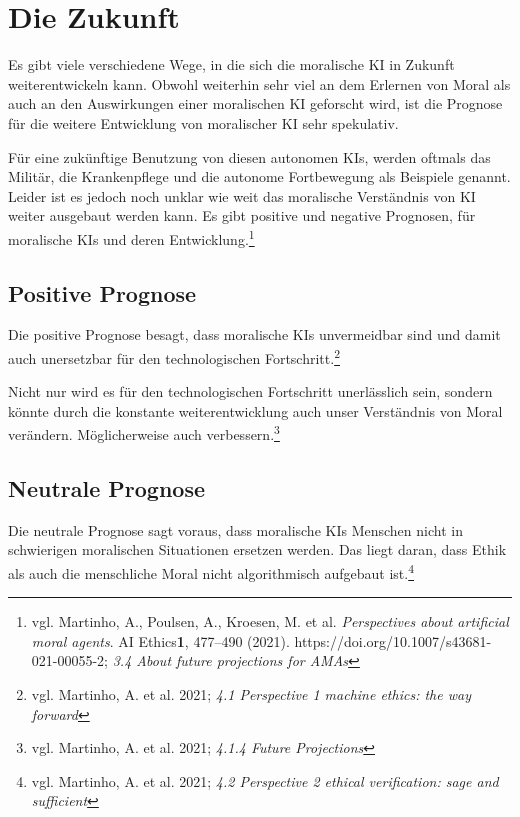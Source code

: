 \section{Die Zukunft}\label{sec::zukunft}

Es gibt viele verschiedene Wege, in die sich die moralische KI in Zukunft weiterentwickeln kann.
Obwohl weiterhin sehr viel an dem Erlernen von Moral als auch an den Auswirkungen einer
moralischen KI geforscht wird, ist die Prognose für die weitere Entwicklung von moralischer KI sehr spekulativ.

Für eine zukünftige Benutzung von diesen autonomen KIs, werden oftmals das Militär, die Krankenpflege
und die autonome Fortbewegung als Beispiele genannt. 
Leider ist es jedoch noch unklar wie weit das moralische Verständnis von KI weiter ausgebaut werden kann.
Es gibt positive und negative Prognosen, für moralische KIs und deren Entwicklung.\footnote{vgl. Martinho, A., Poulsen, A., Kroesen, M. et al. \textit{Perspectives about artificial moral agents}.
AI Ethics\textbf{1}, 477–490 (2021).
https://doi.org/10.1007/s43681-021-00055-2; \textit{3.4 About future projections for AMAs}}

\subsection{Positive Prognose}\label{subsec::positive prognose}

Die positive Prognose besagt, dass moralische KIs unvermeidbar sind und damit auch
unersetzbar für den technologischen Fortschritt.\footnote{vgl. Martinho, A. et al. 2021; \textit{4.1 Perspective 1 machine ethics: the way forward}}

Nicht nur wird es für den technologischen Fortschritt unerlässlich sein, sondern könnte
durch die konstante weiterentwicklung auch unser Verständnis von Moral verändern.
Möglicherweise auch verbessern.\footnote{vgl. Martinho, A. et al. 2021; \textit{4.1.4 Future Projections}}

\subsection{Neutrale Prognose}\label{subsec::neutrale prognose}

Die neutrale Prognose sagt voraus, dass moralische KIs Menschen nicht in schwierigen moralischen
Situationen ersetzen werden.
Das liegt daran, dass Ethik als auch die menschliche Moral nicht algorithmisch aufgebaut ist.\footnote{vgl. Martinho, A. et al. 2021; \textit{4.2 Perspective 2 ethical verification: sage and sufficient}}

